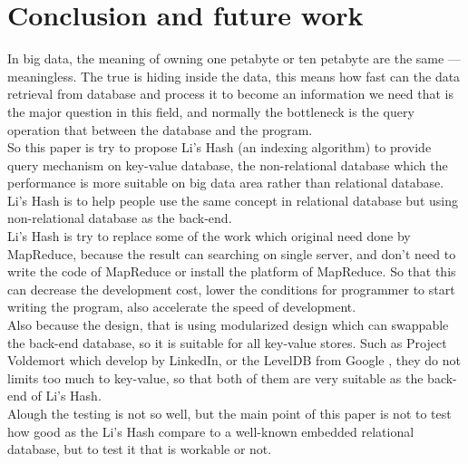 \chapter{Conclusion and future work}
\label{chapter:conclusion_future-work}

\baselineskip=26pt
\thispagestyle{empty}

In big data, the meaning of owning one petabyte or ten petabyte are the same --- meaningless. The true is hiding inside the data, this means how fast can the data retrieval from database and process it to become an information we need that is the major question in this field, and normally the bottleneck is the query operation that between the database \cite{paper:nodb} and the program.\\

So this paper is try to propose Li's Hash (an indexing algorithm) to provide query mechanism on key-value database, the non-relational database which the performance is more suitable on big data area rather than relational database. Li's Hash is to help people use the same concept in relational database but using non-relational database as the back-end.\\

Li's Hash is try to replace some of the work which original need done by MapReduce, because the result can searching on single server, and don't need to write the code of MapReduce or install the platform of MapReduce. So that this can decrease the development cost, lower the conditions for programmer to start writing the program, also accelerate the speed of development.\\

Also because the design, that is using modularized design which can swappable the back-end database, so it is suitable for all key-value stores. Such as Project Voldemort \cite{web:voldemort:home-page} which develop by LinkedIn, or the LevelDB from Google \cite{web:wiki:leveldb}, they do not limits too much to key-value, so that both of them are very suitable as the back-end of Li's Hash.\\

Alough the testing is not so well, but the main point of this paper is not to test how good as the Li's Hash compare to a well-known embedded relational database, but to test it that is workable or not.\\

